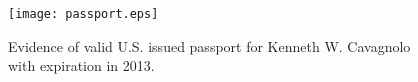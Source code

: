 \documentclass[12pt]{cv}
\begin{document}
\begin{figure}[htp]
  \centering
  \begin{minipage}{0.7\linewidth}
    \texttt{[image: passport.eps]}
    \caption{Evidence of valid U.S. issued passport for Kenneth
      W. Cavagnolo with expiration in 2013.}
  \end{minipage}
\end{figure}
\end{document}
